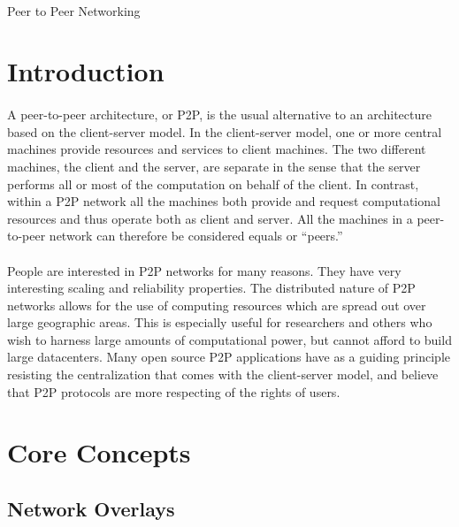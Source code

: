 \documentclass[12pt,letterpaper]{article}
\begin{document}
\onehalfspacing

\paragraph{}
\begin{center}
\Large Peer to Peer Networking
\end{center}

\section{Introduction}

\paragraph{}
A peer-to-peer architecture, or P2P, is the usual alternative to an architecture based on the client-server model.
In the client-server model, one or more central machines provide resources and services to client machines.
The two different machines, the client and the server, are separate in the sense that the server performs all or most of the computation on behalf of the client.
In contrast, within a P2P network all the machines both provide and request computational resources and thus operate both as client and server. 
All the machines in a peer-to-peer network can therefore be considered equals or ``peers.''

\paragraph{}
People are interested in P2P networks for many reasons. 
They have very interesting scaling and reliability properties. 
The distributed nature of P2P networks allows for the use of computing resources which are spread out over large geographic areas. 
This is especially useful for researchers and others who wish to harness large amounts of computational power, but cannot afford to build large datacenters. 
Many open source P2P applications have as a guiding principle resisting the centralization that comes with the client-server model, and believe that P2P protocols are more respecting of the rights of users.

\section{Core Concepts}

\subsection{Network Overlays}
\end{document}
